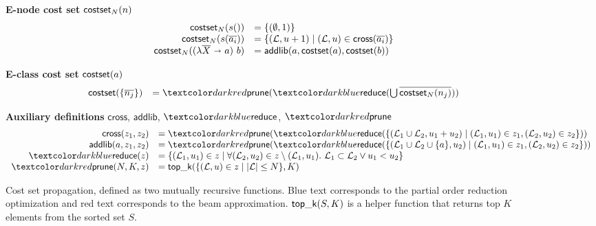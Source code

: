 \begin{figure}
  \textbf{E-node cost set} $\mathsf{costset}_N(n)$
  $$
  \begin{array}{rl}
    \mathsf{costset}_N(s()) &= \{ (\emptyset, 1) \} \\
    \mathsf{costset}_N(s(\overline{a_i})) &= \{ (\mathcal{L}, u + 1) \mid (\mathcal{L}, u) \in \mathsf{cross}(\overline{a_i}) \} \\
    \mathsf{costset}_N((\lambda \overline{X} \ \mathbf{\shortrightarrow}\  a)\ b) &= \mathsf{addlib}(a, \mathsf{costset}(a), \mathsf{costset}(b)) \\
    \end{array}
  $$

  \textbf{E-class cost set} $\mathsf{costset}(a)$
  $$
  \begin{array}{rl}
    \cs(\{ \many{n_j} \}) &= \sfprune(\sfunify(\bigcup \many{\cs_N(n_j)})) \\
  \end{array}
  $$

  \textbf{Auxiliary definitions} $\mathsf{cross}$, $\mathsf{addlib}$, $\sfunify$, $\sfprune$
  $$
  \begin{array}{rl}
    \mathsf{cross}(z_1, z_2) &= \sfprune(\sfunify(\{ (\libset_1 \cup \libset_2, u_1 + u_2) \mid (\libset_1, u_1) \in z_1, (\libset_2, u_2) \in z_2 \})) \\
    \mathsf{addlib}(a, z_1, z_2) &= \sfprune(\sfunify(\{ (\libset_1 \cup \libset_2 \cup \{ a \}, u_2) \mid (\libset_1, u_1) \in z_1, (\libset_2, u_2) \in z_2 \})) \\
    \sfunify(z) &= \{ (\libset_1, u_1) \in z \mid \forall (\libset_2, u_2) \in z \setminus (\libset_1, u_1).\ \libset_1 \subset \libset_2 \lor u_1 < u_2 \} \\
    \sfprune(N, K, z) &=  \sftopk(\{(\libset, u) \in z \mid |\libset| \leq N \}, K)\\
  \end{array}
  $$
\caption{Cost set propagation, defined as two mutually
  recursive functions. Blue text corresponds to the partial order
  reduction optimization and red text corresponds to the beam approximation.
  $\mathsf{top\_k}(S, K)$ is a helper function that returns top $K$
  elements from the sorted set $S$.}
  \label{fig:costset}
\end{figure}




